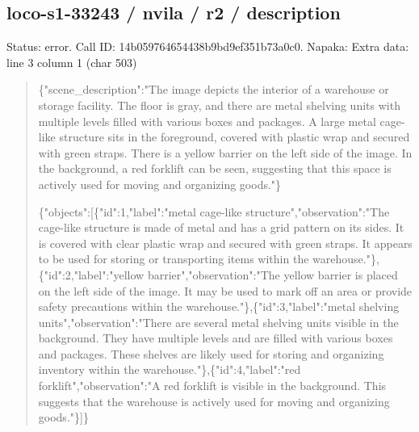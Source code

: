 \documentclass[10pt,a4paper]{article}
\begin{document}
\subsection*{loco-s1-33243 / nvila / r2 / description}
Status: error. Call ID: 14b059764654438b9bd9ef351b73a0c0. Napaka: Extra data: line 3 column 1 (char 503)
\begin{quote}\footnotesize
\{"scene\_description":\allowbreak{}"The image depicts the interior of a warehouse or storage facility. The floor is gray,\allowbreak{} and there are metal shelving units with multiple levels filled with various boxes and packages. A large metal cage-like structure sits in the foreground,\allowbreak{} covered with plastic wrap and secured with green straps. There is a yellow barrier on the left side of the image. In the background,\allowbreak{} a red forklift can be seen,\allowbreak{} suggesting that this space is actively used for moving and organizing goods."\}\par
\par
\{"objects":\allowbreak{}[\{"id":\allowbreak{}1,\allowbreak{}"label":\allowbreak{}"met\allowbreak{}al cage-like structure",\allowbreak{}"observation":\allowbreak{}"The cage-like structure is made of metal and has a grid pattern on its sides. It is covered with clear plastic wrap and secured with green straps. It appears to be used for storing or transporting items within the warehouse."\},\allowbreak{}\{"id":\allowbreak{}2,\allowbreak{}"label":\allowbreak{}"ye\allowbreak{}llow barrier",\allowbreak{}"observation":\allowbreak{}"The yellow barrier is placed on the left side of the image. It may be used to mark off an area or provide safety precautions within the warehouse."\},\allowbreak{}\{"id":\allowbreak{}3,\allowbreak{}"label":\allowbreak{}"me\allowbreak{}tal shelving units",\allowbreak{}"observation":\allowbreak{}"There are several metal shelving units visible in the background. They have multiple levels and are filled with various boxes and packages. These shelves are likely used for storing and organizing inventory within the warehouse."\},\allowbreak{}\{"id":\allowbreak{}4,\allowbreak{}"label":\allowbreak{}"re\allowbreak{}d forklift",\allowbreak{}"observation":\allowbreak{}"A red forklift is visible in the background. This suggests that the warehouse is actively used for moving and organizing goods."\}]\}
\end{quote}
\end{document}
